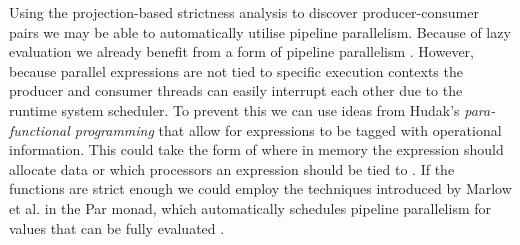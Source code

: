 Using the projection-based strictness analysis to discover producer-consumer
pairs we may be able to automatically utilise pipeline parallelism. Because of
lazy evaluation we already benefit from a form of pipeline parallelism
\citep{whyFPmatters}. However, because parallel expressions are not tied to
specific execution contexts  the producer and consumer threads can easily interrupt
each other due to the runtime system scheduler. To prevent this we can use
ideas from Hudak's \emph{para-functional programming} that allow for
expressions to be tagged with operational information. This could take the form
of where in memory the expression should allocate data or which processors an
expression should be tied to \citep{hudak1986functional}. If the functions are
strict enough we could employ the techniques introduced by Marlow et al. in the
Par monad, which automatically schedules pipeline parallelism for values that
can be fully evaluated \citep{marlow2011monad}.
